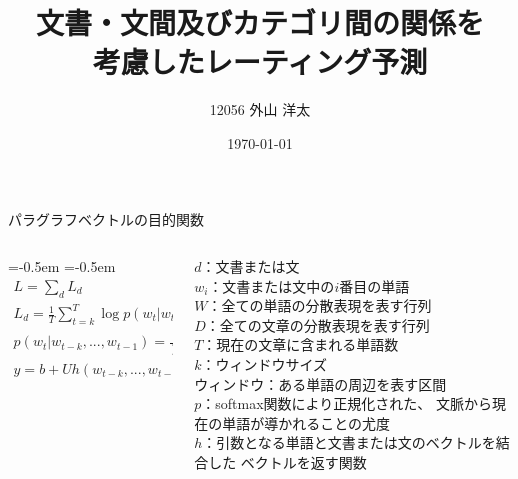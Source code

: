 \documentclass[aspectratio=43,unicode,10pt]{beamer}
\title{文書・文間及びカテゴリ間の関係を\\考慮したレーティング予測}
\institute{知能数理研究室}
\author{12056 外山 洋太}
\date{\today}
\newlength{\mycolumnwidth}
\begin{document}
\begin{frame}{パラグラフベクトルの目的関数}{}
  \begin{columns}
    \begin{column}{\mycolumnwidth}
      \abovedisplayskip=-0.5em %
      \belowdisplayskip=-0.5em %
      \begin{gather*}
        L = \sum_d L_d \\
        L_d = \frac{1}{T} \sum^{T}_{t = k}
              \log p(w_t | w_{t-k}, ..., w_{t-1}), \\
        p(w_t | w_{t-k}, ..., w_{t-1}) = \frac{e^{y_{w_t}}}{\sum_i e^{y_i}}, \\
        y = b + Uh(w_{t-k}, ..., w_{t-1}, d; W, D)
      \end{gather*}
    \end{column}
    \begin{column}{\mycolumnwidth}
      \footnotesize
      $d$：文書または文 \\
      $w_i$：文書または文中の$i$番目の単語 \\
      $W$：全ての単語の分散表現を表す行列 \\
      $D$：全ての文章の分散表現を表す行列 \\
      $T$：現在の文章に含まれる単語数 \\
      $k$：ウィンドウサイズ \\
      ウィンドウ：ある単語の周辺を表す区間 \\
      $p$：softmax関数により正規化された、
           文脈から現在の単語が導かれることの尤度 \\
      $h$：引数となる単語と文書または文のベクトルを結合した
           ベクトルを返す関数 \\
    \end{column}
  \end{columns}
\end{frame}
\end{document}
